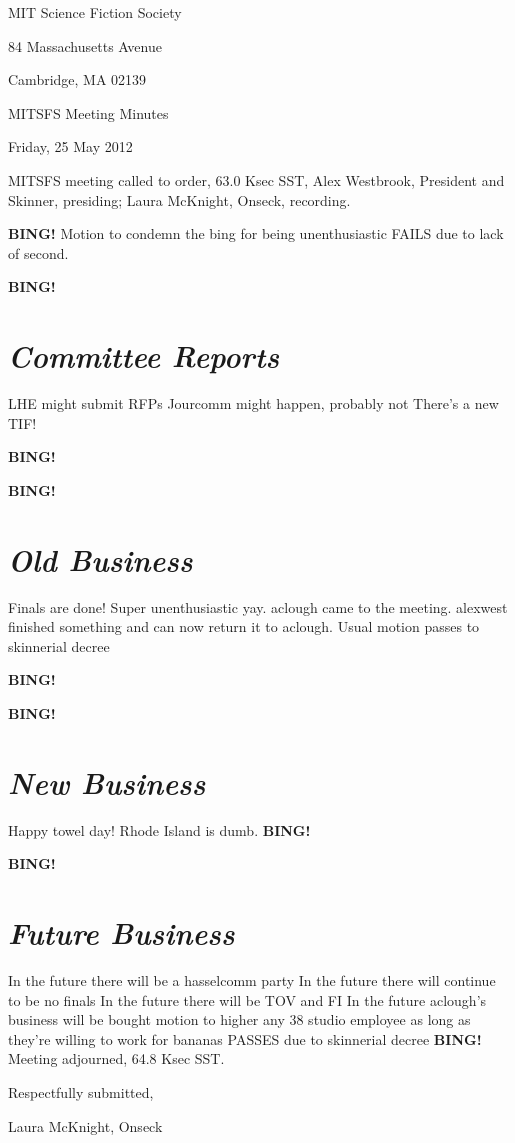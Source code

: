 \documentclass[10pt]{article}
\newcommand{\bing}{{\bf BING!} }
\newcommand{\goto}[1]{\bing \vskip 12pt \section*{{\em{#1}}}}
\newcommand{\skinner}{Alex Westbrook, President and Skinner}
\newcommand{\onseck}{Laura McKnight, Onseck}
\newcommand{\meetingdate}{Friday, 25 May 2012}
\begin{document}
\begin{center}

MIT Science Fiction Society

84 Massachusetts Avenue

Cambridge, MA 02139

\vspace{12pt}

MITSFS Meeting Minutes

\meetingdate

\end{center}

\vspace{18pt}

\setlength{\parskip}{6pt}

\noindent
MITSFS meeting called to order, 63.0 Ksec SST,
\skinner, presiding; \onseck, recording.

\bing
Motion to condemn the bing for being unenthusiastic FAILS due to lack of second.

\goto{Committee Reports}
LHE might submit RFPs
Jourcomm might happen, probably not
There's a new TIF!

\bing

\goto{Old Business}
Finals are done!
Super unenthusiastic yay.
aclough came to the meeting.
alexwest finished something and can now return it to aclough.
Usual motion passes to skinnerial decree

\bing

\goto{New Business}
Happy towel day! 
Rhode Island is dumb.
\bing

\goto{Future Business}
In the future there will be a hasselcomm party
In the future there will continue to be no finals
In the future there will be TOV and FI
In the future aclough's business will be bought
motion to higher any 38 studio employee as long as they're willing to work for bananas PASSES due to skinnerial decree
\bing
\noindent
Meeting adjourned, 64.8 Ksec SST.

\vspace{18pt}

\centerline{Respectfully submitted,}
\centerline{\onseck}
\end{document}

